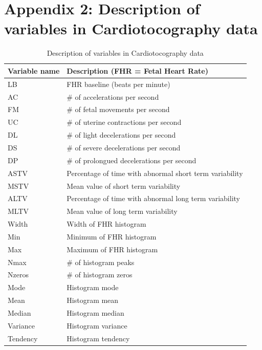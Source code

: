 \documentclass[11pt]{llncs}
\begin{document}
\section*{Appendix 2: Description of variables in Cardiotocography data}
\begin{table}[H]\centering
    \begin{tabular}{l|l}
    \hline
    Variable name & Description (FHR = Fetal Heart Rate)                     \\ \hline
    LB            & FHR baseline (beats per minute)                          \\
    AC            &  \# of accelerations per second                \\
    FM            & \# of fetal movements per second               \\
    UC            & \# of uterine contractions per second          \\
    DL            & \# of light decelerations per second           \\
    DS            & \# of severe decelerations per second          \\
    DP            & \# of prolongued decelerations per second      \\ \hline
    ASTV          & Percentage of time with abnormal short term variability  \\
    MSTV          & Mean value of short term variability                     \\
    ALTV          & Percentage of time with abnormal long term variability   \\
    MLTV          & Mean value of long term variability                      \\ \hline
    Width         & Width of FHR histogram                                   \\
    Min           & Minimum of FHR histogram                                 \\
    Max           & Maximum of FHR histogram                                 \\
    Nmax          & \# of histogram peaks                          \\
    Nzeros        & \# of histogram zeros                          \\
    Mode          & Histogram mode                                           \\
    Mean          & Histogram mean                                           \\
    Median        & Histogram median                                         \\
    Variance      & Histogram variance                                       \\
    Tendency      & Histogram tendency                                       \\ \hline
    \end{tabular}
    \caption{Description of variables in Cardiotocography data}
\end{table}
\end{document}
